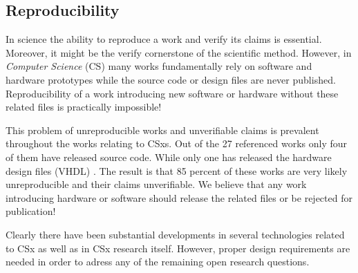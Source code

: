 


\subsection{Reproducibility}

In science the ability to reproduce a work and verify its claims is essential.
Moreover, it might be the verify cornerstone of the scientific method. However,
in \textit{Computer Science} (CS) many works fundamentally rely on software and
hardware prototypes while the source code or design files are never published.
Reproducibility of a work introducing new software or hardware without these
related files is practically impossible!

This problem of unreproducible works and unverifiable claims is prevalent
throughout the works relating to CSxs. Out of the 27 referenced works only four
\cite{10.14778/3137628.3137632, 234968, 8839401, lukken2021zcsd}
\footnotemark[8] of them have released source code. While only one has released
the hardware design files (VHDL) \cite{10.14778/3137628.3137632}. The result is
that 85 percent of these works are very likely unreproducible and their claims
unverifiable. We believe that any work introducing hardware or software should
release the related files or be rejected for publication!

Clearly there have been substantial developments in several technologies related
to CSx as well as in CSx research itself. However, proper design requirements
are needed in order to adress any of the remaining open research questions.


